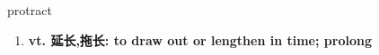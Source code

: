 
\begin{frame}
{\huge protract}
\begin{center}
\begin{enumerate}\Large
  \item \textbf{vt. 延长,拖长: to draw out or lengthen in time; prolong}
\end{enumerate}
\end{center}
\end{frame}
